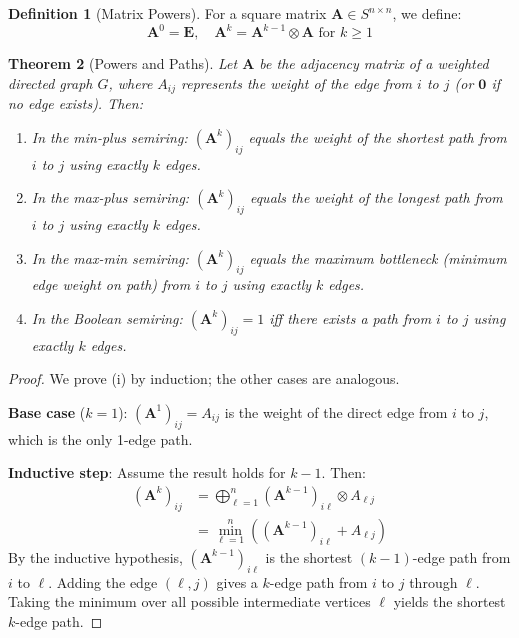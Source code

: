 \documentclass[11pt,a4paper]{article}
\theoremstyle{plain}
\newtheorem{theorem}{Theorem}[section]
\theoremstyle{definition}
\newtheorem{definition}[theorem]{Definition}
\newcommand{\mat}[1]{\mathbf{#1}}
\begin{document}
\begin{definition}[Matrix Powers]
For a square matrix $\mat{A} \in S^{n \times n}$, we define:
\begin{equation}
    \mat{A}^0 = \mat{E}, \quad \mat{A}^k = \mat{A}^{k-1} \otimes \mat{A} \text{ for } k \geq 1
\end{equation}
\end{definition}

\begin{theorem}[Powers and Paths]
\label{thm:powers-paths}
Let $\mat{A}$ be the adjacency matrix of a weighted directed graph $G$, where $A_{ij}$ represents the weight of the edge from $i$ to $j$ (or $\mathbf{0}$ if no edge exists). Then:
\begin{enumerate}[label=(\roman*)]
    \item In the min-plus semiring: $(\mat{A}^k)_{ij}$ equals the weight of the shortest path from $i$ to $j$ using exactly $k$ edges.
    \item In the max-plus semiring: $(\mat{A}^k)_{ij}$ equals the weight of the longest path from $i$ to $j$ using exactly $k$ edges.
    \item In the max-min semiring: $(\mat{A}^k)_{ij}$ equals the maximum bottleneck (minimum edge weight on path) from $i$ to $j$ using exactly $k$ edges.
    \item In the Boolean semiring: $(\mat{A}^k)_{ij} = 1$ iff there exists a path from $i$ to $j$ using exactly $k$ edges.
\end{enumerate}
\end{theorem}

\begin{proof}
We prove (i) by induction; the other cases are analogous.

\textbf{Base case} ($k=1$): $(\mat{A}^1)_{ij} = A_{ij}$ is the weight of the direct edge from $i$ to $j$, which is the only 1-edge path.

\textbf{Inductive step}: Assume the result holds for $k-1$. Then:
\begin{align*}
    (\mat{A}^k)_{ij} &= \bigoplus_{\ell=1}^n (\mat{A}^{k-1})_{i\ell} \otimes A_{\ell j} \\
    &= \min_{\ell=1}^n \left((\mat{A}^{k-1})_{i\ell} + A_{\ell j}\right)
\end{align*}
By the inductive hypothesis, $(\mat{A}^{k-1})_{i\ell}$ is the shortest $(k-1)$-edge path from $i$ to $\ell$. Adding the edge $(\ell, j)$ gives a $k$-edge path from $i$ to $j$ through $\ell$. Taking the minimum over all possible intermediate vertices $\ell$ yields the shortest $k$-edge path.
\end{proof}
\end{document}
